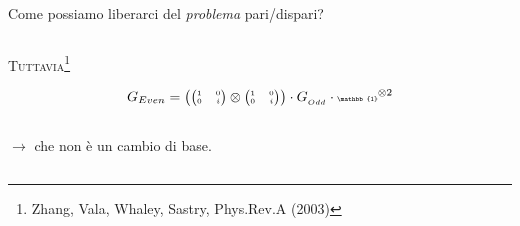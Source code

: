 \documentclass[xcolor=x11names,compress]{beamer}
\renewcommand{\(}{\begin{columns}}
\renewcommand{\)}{\end{columns}}
\newcommand{\<}[1]{\begin{column}{#1}}
\renewcommand{\>}{\end{column}}
\begin{document}
\begin{frame}{Come possiamo liberarci del \emph{problema} pari/dispari?}
\begin{columns}[c]
\begin{column}{0.5\textwidth}
\vspace{0.4cm}

\begin{block}{\textcolor{myred}{\textsc{Tuttavia\footnote{\tiny{Zhang, Vala, Whaley, Sastry, Phys.Rev.A (2003)}}}}}

\vspace{-0.1cm}

\scriptsize{$$G_{Even} = \tiny{\left( \begin{pmatrix} 1 & 0\\ 0 & i\\ \end{pmatrix} \otimes \begin{pmatrix} 1 & 0\\ 0 & i\\ \end{pmatrix} \right) } \cdot G_{_{Odd}} \cdot \mathbb{1}^{\otimes 2}$$\\
$\rightarrow$ che non è un cambio di base.}
\end{block}

\end{column}
\end{columns}


\end{frame}
\end{document}
